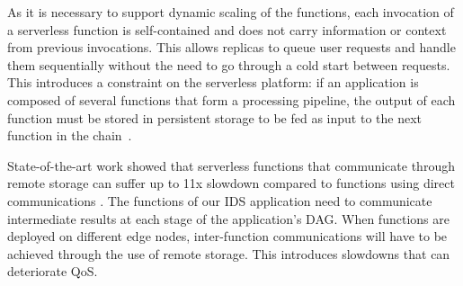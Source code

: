 
As it is necessary to support dynamic scaling of the functions, each invocation of a serverless function is self-contained and does not carry information or context from previous invocations. This allows replicas to queue user requests and handle them sequentially without the need to go through a cold start between requests. This introduces a constraint on the serverless platform: if an application is composed of several functions that form a processing pipeline, the output of each function must be stored in persistent storage to be fed as input to the next function in the chain~\cite{mullerLambadaInteractiveData2020}.

State-of-the-art work showed that serverless functions that communicate through remote storage can suffer up to 11x slowdown compared to functions using direct communications \cite{wawrzoniakBoxerDataAnalytics2021a}. The functions of our IDS application need to communicate intermediate results at each stage of the application's DAG. When functions are deployed on different edge nodes, inter-function communications will have to be achieved through the use of remote storage. This introduces slowdowns that can %
deteriorate QoS.



